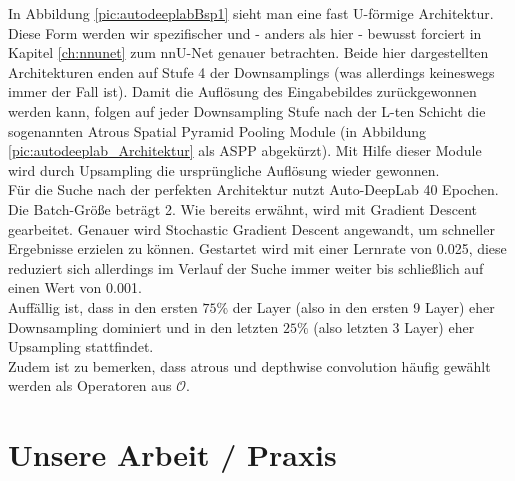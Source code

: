 In Abbildung \ref{pic:autodeeplabBsp1} sieht man eine fast U-förmige Architektur. Diese Form werden wir spezifischer und - anders als hier - bewusst forciert in Kapitel \ref{ch:nnunet} zum nnU-Net genauer betrachten. Beide hier dargestellten Architekturen enden auf Stufe 4 der Downsamplings (was allerdings keineswegs immer der Fall ist). Damit die Auflösung des Eingabebildes zurückgewonnen werden kann, folgen auf jeder Downsampling Stufe nach der L-ten Schicht die sogenannten Atrous Spatial Pyramid Pooling Module (in Abbildung \ref{pic:autodeeplab_Architektur} als ASPP abgekürzt). Mit Hilfe dieser Module wird durch Upsampling die ursprüngliche Auflösung wieder gewonnen.\\[0.3cm]
Für die Suche nach der perfekten Architektur nutzt Auto-DeepLab 40 Epochen. Die Batch-Größe beträgt 2. Wie bereits erwähnt, wird mit Gradient Descent gearbeitet. Genauer wird Stochastic Gradient Descent angewandt, um schneller Ergebnisse erzielen zu können. Gestartet wird mit einer Lernrate von 0.025, diese reduziert sich allerdings im Verlauf der Suche immer weiter bis schließlich auf einen Wert von 0.001.\\
Auffällig ist, dass in den ersten $75\%$ der Layer (also in den ersten 9 Layer) eher Downsampling dominiert und in den letzten $25\%$ (also letzten 3 Layer) eher Upsampling stattfindet.\\
Zudem ist zu bemerken, dass atrous und depthwise convolution häufig gewählt werden als Operatoren aus $\mathcal{O}$.



\section{Unsere Arbeit / Praxis}

